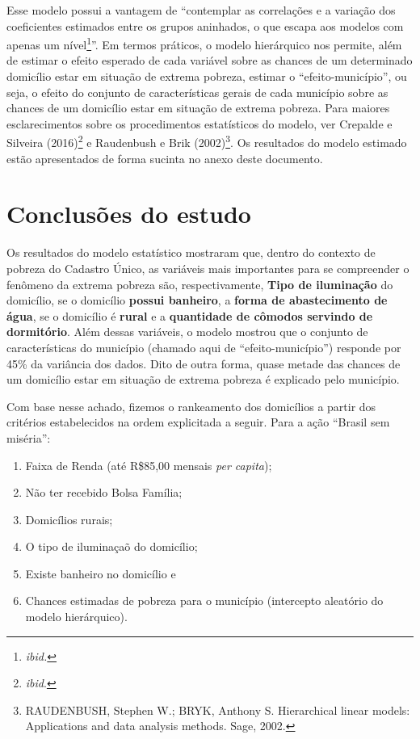 \documentclass[a4paper, 12pt, openright, oneside, english, brazil, article]{abntex2}
\begin{document}
	Esse modelo possui a vantagem de ``contemplar as correlações e a variação dos coeficientes estimados entre os grupos aninhados, o que escapa aos modelos com apenas um nível\footnote{\textit{ibid.}}''. Em termos práticos, o modelo hierárquico nos permite, além de estimar o efeito esperado de cada variável sobre as chances de um determinado domicílio estar em situação de extrema pobreza, estimar o ``efeito-município'', ou seja, o efeito do conjunto de características gerais de cada município sobre as chances de um domicílio estar em situação de extrema pobreza. Para maiores esclarecimentos sobre os procedimentos estatísticos do modelo, ver Crepalde e Silveira (2016)\footnote{\textit{ibid}.} e Raudenbush e Brik (2002)\footnote{RAUDENBUSH, Stephen W.; BRYK, Anthony S. Hierarchical linear models: Applications and data analysis methods. Sage, 2002.}. Os resultados do modelo estimado estão apresentados de forma sucinta no anexo deste documento.

	\section{Conclusões do estudo}
	
	Os resultados do modelo estatístico mostraram que, dentro do contexto de pobreza do Cadastro Único, as variáveis mais importantes para se compreender o fenômeno da extrema pobreza são, respectivamente, \textbf{Tipo de iluminação} do domicílio, se o domicílio \textbf{possui banheiro}, a \textbf{forma de abastecimento de água}, se o domicílio é \textbf{rural} e a \textbf{quantidade de cômodos servindo de dormitório}. Além dessas variáveis, o modelo mostrou que o conjunto de características do município (chamado aqui de ``efeito-município'') responde por 45\% da variância dos dados. Dito de outra forma, quase metade das chances de um domicílio estar em situação de extrema pobreza é explicado pelo município.
	
	Com base nesse achado, fizemos o rankeamento dos domicílios a partir dos critérios estabelecidos na ordem explicitada a seguir. Para a ação ``Brasil sem miséria'':
	
	\begin{enumerate}
		\item Faixa de Renda (até R\$85,00 mensais \textit{per capita});
		\item Não ter recebido Bolsa Família;
		\item Domicílios rurais;
		\item O tipo de iluminaçaõ do domicílio;
		\item Existe banheiro no domicílio e
		\item Chances estimadas de pobreza para o município (intercepto aleatório do modelo hierárquico).
	\end{enumerate}
\end{document}
